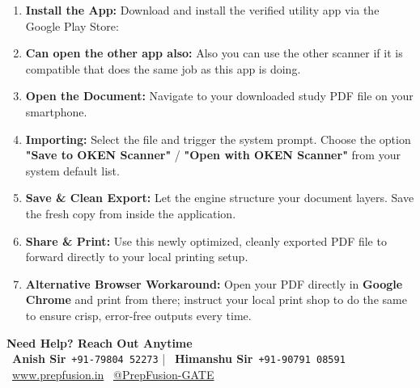 \begin{stepbox}
  \small
  \begin{enumerate}
    \item \textbf{Install the App:} Download and install the verified utility app via the Google Play Store: \\
    \item\textbf{Can open the other app also: } Also you  can use the other scanner if it is compatible  that does the same job as this app is doing.
    \item \textbf{Open the Document:} Navigate to your downloaded study PDF file on your smartphone.
    \item \textbf{Importing:} Select the file and trigger the system prompt. Choose the option \textbf{"Save to OKEN Scanner"} / \textbf{"Open with OKEN Scanner"} from your system default list.
    \item \textbf{Save \& Clean Export:} Let the engine structure your document layers. Save the fresh copy from inside the application.
    \item \textbf{Share \& Print:} Use this newly optimized, cleanly exported PDF file to forward directly to your local printing setup.
    \item \textbf{Alternative Browser Workaround:} Open your PDF directly in \textbf{Google Chrome} and print from there; instruct your local print shop to do the same to ensure crisp, error-free outputs every time.
    
  \end{enumerate}
\end{stepbox}
\vspace{16pt}
\sectionrule

\begin{tcolorbox}[
  enhanced,
  colback   = pfNavy,
  colframe  = pfNavy,
  arc       = 4pt,
  boxrule   = 0pt,
  left=12pt, right=12pt, top=10pt, bottom=10pt,
]
  \centering
  {\bfseries\color{white}Need Help? Reach Out Anytime}\\[6pt]
  \small\color{pfMid}
  \faWhatsapp\ \textbf{\color{white}Anish Sir}\ \texttt{+91-79804 52273}
  \quad\textcolor{pfMid}{|}\quad
  \faWhatsapp\ \textbf{\color{white}Himanshu Sir}\ \texttt{+91-90791 08591}\\[6pt]
  \faGlobe\ \href{https://prepfusion.in}{\color{white}www.prepfusion.in}
  \qquad
  \faYoutube\ \href{https://youtube.com/@PrepFusion-GATE}{\color{white}@PrepFusion-GATE}
\end{tcolorbox}
